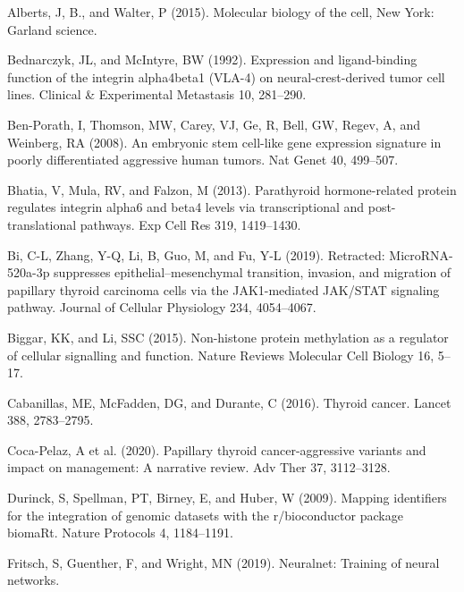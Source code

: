 \documentclass[
  11pt,
  parskip,
  oneside]{scrreprt}
\newlength{\cslhangindent}
\newlength{\cslentryspacingunit} %
\newenvironment{CSLReferences}[2] %
 {%
  \setlength{\parindent}{0pt}
  \ifodd #1
  \let\oldpar\par
  \def\par{\hangindent=\cslhangindent\oldpar}
  \fi
  \setlength{\parskip}{#2\cslentryspacingunit}
 }%
 {}
\begin{document}
\hypertarget{refs}{}
\begin{CSLReferences}{0}{0}
\leavevmode{}%
Alberts, J, B., and Walter, P (2015). Molecular biology of the cell, New
York: Garland science.

\leavevmode{}%
Bednarczyk, JL, and McIntyre, BW (1992). Expression and ligand-binding
function of the integrin alpha4beta1 (VLA-4) on neural-crest-derived
tumor cell lines. Clinical \& Experimental Metastasis 10, 281--290.

\leavevmode{}%
Ben-Porath, I, Thomson, MW, Carey, VJ, Ge, R, Bell, GW, Regev, A, and
Weinberg, RA (2008). An embryonic stem cell-like gene expression
signature in poorly differentiated aggressive human tumors. Nat Genet
40, 499--507.

\leavevmode{}%
Bhatia, V, Mula, RV, and Falzon, M (2013). Parathyroid hormone-related
protein regulates integrin alpha6 and beta4 levels via transcriptional
and post-translational pathways. Exp Cell Res 319, 1419--1430.

\leavevmode{}%
Bi, C-L, Zhang, Y-Q, Li, B, Guo, M, and Fu, Y-L (2019). Retracted:
MicroRNA-520a-3p suppresses epithelial--mesenchymal transition,
invasion, and migration of papillary thyroid carcinoma cells via the
JAK1-mediated JAK/STAT signaling pathway. Journal of Cellular Physiology
234, 4054--4067.

\leavevmode{}%
Biggar, KK, and Li, SSC (2015). Non-histone protein methylation as a
regulator of cellular signalling and function. Nature Reviews Molecular
Cell Biology 16, 5--17.

\leavevmode{}%
Cabanillas, ME, McFadden, DG, and Durante, C (2016). Thyroid cancer.
Lancet 388, 2783--2795.

\leavevmode{}%
Coca-Pelaz, A et al. (2020). Papillary thyroid cancer-aggressive
variants and impact on management: A narrative review. Adv Ther 37,
3112--3128.

\leavevmode{}%
Durinck, S, Spellman, PT, Birney, E, and Huber, W (2009). Mapping
identifiers for the integration of genomic datasets with the
r/bioconductor package biomaRt. Nature Protocols 4, 1184--1191.

\leavevmode{}%
Fritsch, S, Guenther, F, and Wright, MN (2019). Neuralnet: Training of
neural networks.


\end{CSLReferences}
\end{document}
